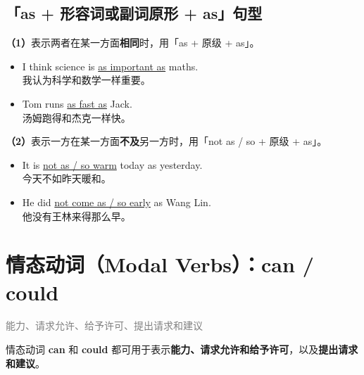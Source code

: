 \documentclass[11pt,a4paper]{ctexart}
\begin{document}
\subsection*{「as + 形容词或副词原形 + as」句型}

\textbf{（1）}表示两者在某一方面\textbf{相同}时，用「as + 原级 + as」。

\begin{itemize}[leftmargin=1.4em]
\item I think science is \underline{as important as} maths.\\ 我认为科学和数学一样重要。
\item Tom runs \underline{as fast as} Jack.\\ 汤姆跑得和杰克一样快。
\end{itemize}

\textbf{（2）}表示一方在某一方面\textbf{不及}另一方时，用「not as / so + 原级 + as」。

\begin{itemize}[leftmargin=1.4em]
\item It is \underline{not as / so warm} today as yesterday.\\ 今天不如昨天暖和。
\item He did \underline{not come as / so early} as Wang Lin.\\ 他没有王林来得那么早。
\end{itemize}

\section{情态动词（Modal Verbs）：can / could}
\noindent\textcolor{gray}{能力、请求允许、给予许可、提出请求和建议}\par\smallskip
情态动词 \textbf{can} 和 \textbf{could} 都可用于表示\textbf{能力、请求允许和给予许可}，以及\textbf{提出请求和建议}。
\end{document}

